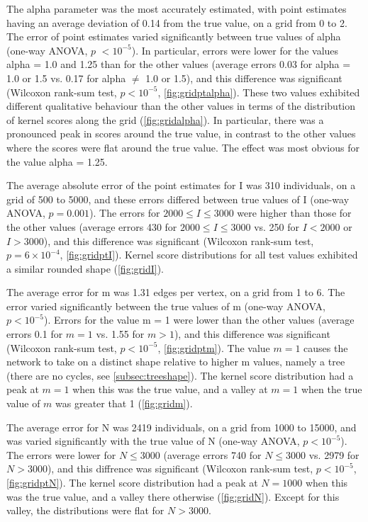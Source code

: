 The \gls{alpha} parameter was the most accurately estimated, with point
estimates having an average deviation of 
    0.14
from the true value, on a grid from 0 to 2. The error of point estimates varied
significantly between true values of \gls{alpha}
    (one-way \gls{ANOVA}, $p$ ${<}10^{-5}$). In
particular, errors were lower for the values \gls{alpha} = 1.0 and 1.25 than
for the other values
    (average errors 
    0.03
    for \gls{alpha} = 1.0 or 1.5 vs.
    0.17
    for \gls{alpha} $\neq$ 1.0 or 1.5),
and this difference was significant
    (Wilcoxon rank-sum test, $p {<}10^{-5}$,
     \cref{fig:gridptalpha}).
These two values exhibited different qualitative behaviour than the other
values in terms of the distribution of kernel scores along the grid
(\cref{fig:gridalpha}). In particular, there was a pronounced peak in scores
around the true value, in contrast to the other values where the scores were
flat around the true value. The effect was most obvious for the value
\gls{alpha} = 1.25.

The average absolute error of the point estimates for \gls{I} was 
    310 individuals,
on a grid of 500 to 5000, and these errors differed between true values of
\gls{I}
    (one-way \gls{ANOVA}, $p =0.001$).
The errors for $2000 \leq I \leq 3000$ were higher than those for the other
values
    (average errors
     430
     for $2000 \leq I \leq 3000$ vs.
     250
     for $I < 2000$ or $I > 3000$),
and this difference was significant
    (Wilcoxon rank-sum test, $p =6\!\times\!10^{-4}$,
     \cref{fig:gridptI}).
Kernel score distributions for all test values exhibited a similar rounded
shape (\cref{fig:gridI}). 

The average error for \gls{m} was
    1.31 edges per vertex,
on a grid from 1 to 6. The error varied significantly between the true values
of \gls{m} 
    (one-way \gls{ANOVA}, $p {<}10^{-5}$).
Errors for the value \gls{m} = 1 were lower than the other values
    (average errors
    0.1
    for $m = 1$ vs.
    1.55
    for $m > 1$),
and this difference was significant
    (Wilcoxon rank-sum test, $p {<}10^{-5}$,
     \cref{fig:gridptm}).
The value $m = 1$ causes the network to take on a distinct shape relative to
higher \gls{m} values, namely a tree (\ie there are no cycles, see
\cref{subsec:treeshape}). The kernel score distribution had a peak at $m = 1$
when this was the true value, and a valley at $m = 1$ when the true value of
$m$ was greater that 1 (\cref{fig:gridm}).

The average error for \gls{N} was 
    2419 individuals,
on a grid from 1000 to 15000, and was varied significantly with the true value
of \gls{N}
    (one-way \gls{ANOVA}, $p {<}10^{-5}$).
The errors were lower for $N \leq 3000$
    (average errors
     740
     for $N \leq 3000$ vs.
     2979
     for $N > 3000$),
and this diffrence was significant
    (Wilcoxon rank-sum test, $p {<}10^{-5}$,
     \cref{fig:gridptN}).
The kernel score distribution had a peak at $N = 1000$ when this was the true
value, and a valley there otherwise (\cref{fig:gridN}). Except for this valley,
the distributions were flat for $N > 3000$.


